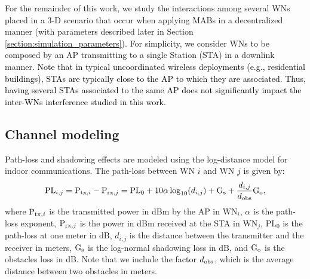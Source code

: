 \documentclass{article}
\begin{document}
	For the remainder of this work, we study the interactions among several WNs placed in a 3-D scenario that occur when applying MABs in a decentralized manner (with parameters described later in Section \ref{section:simulation_parameters}). For simplicity, we consider WNs to be composed by an AP transmitting to a single Station (STA) in a downlink manner. \textcolor{black}{Note that in typical uncoordinated wireless deployments (e.g., residential buildings), STAs are typically close to the AP to which they are associated. Thus, having several STAs associated to the same AP does not significantly impact the inter-WNs interference \textcolor{black}{studied} in this work.}
	
	\subsection{Channel modeling}
	\label{section:channel_modelling}		
	Path-loss and shadowing effects are modeled using the log-distance model for indoor communications. The path-loss between WN $i$ and WN $j$ is given by:	
	\begin{equation}
	\text{PL}_{i,j} = \text{P}_{{\rm tx},i} - \text{P}_{{\rm rx},j} = \text{PL}_0 + 10  \alpha  \log_{10}(d_{i,j}) + \text{G}_{{\rm s}} + \frac{d_{i,j}}{d_{{\rm obs}}} \text{G}_{{\rm o}}, \nonumber
	\nonumber
	\end{equation}
	where $\text{P}_{{\rm tx},i}$ is the transmitted power in dBm by the AP in $\text{WN}_i$, $\alpha$ is the path-loss exponent, $\text{P}_{{\rm rx},j}$ is the power in dBm received at the STA in $\text{WN}_j$, $\text{PL}_0$ is the path-loss at one meter in dB, $d_{i,j}$ is the distance between the transmitter and the receiver in meters, $\text{G}_{{\rm s}}$ is the log-normal shadowing loss in dB, and $\text{G}_{{\rm o}}$ is the obstacles loss in dB. Note that we include the factor $d_{{\rm obs}}$, which is the average distance between two obstacles in meters. 
	
\end{document}
